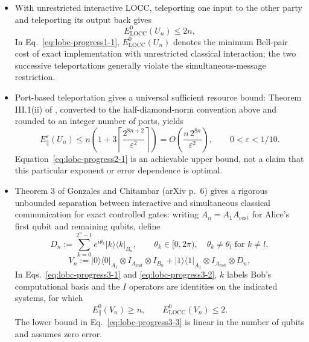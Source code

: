 \begin{itemize}
  \item With unrestricted interactive LOCC, teleporting one input to the other party and teleporting its output back gives
  \begin{equation}
E_{\mathrm{LOCC}}^{0}(U_n)\leq2n,
\label{eq:lobc-progress1-1}
\end{equation}
  In Eq.~\eqref{eq:lobc-progress1-1}, $E_{\mathrm{LOCC}}^{0}(U_n)$ denotes the minimum Bell-pair cost of exact implementation with unrestricted classical interaction; the two successive teleportations generally violate the simultaneous-message restriction. 

  \item Port-based teleportation gives a universal sufficient resource bound: Theorem III.1(ii) of , converted to the half-diamond-norm convention above and rounded to an integer number of ports, yields
  \begin{equation}
E_{\parallel}^{\varepsilon}(U_n)
  \leq n\left(1+3\left\lceil\frac{2^{8n+2}}{\varepsilon^2}\right\rceil\right)
  =O\left(\frac{n\,2^{8n}}{\varepsilon^2}\right),
  \qquad 0<\varepsilon<1/10.
\label{eq:lobc-progress2-1}
\end{equation}
  Equation~\eqref{eq:lobc-progress2-1} is an achievable upper bound, not a claim that this particular exponent or error dependence is optimal. 

  \item Theorem 3 of Gonzales and Chitambar (arXiv p.~6) gives a rigorous unbounded separation between interactive and simultaneous classical communication for exact controlled gates: writing $A_n=A_1A_{\mathrm{rest}}$ for Alice's first qubit and remaining qubits, define
  \begin{equation}
D_n:=\sum_{k=0}^{2^n-1}e^{i\theta_k}|k\rangle\langle k|_{B_n},
  \qquad
  \theta_k\in[0,2\pi),\quad\theta_k\neq\theta_l\text{ for }k\neq l,
\label{eq:lobc-progress3-1}
\end{equation}
  \begin{equation}
V_n:=|0\rangle\langle0|_{A_1}\otimes I_{A_{\mathrm{rest}}}\otimes I_{B_n}
  +|1\rangle\langle1|_{A_1}\otimes I_{A_{\mathrm{rest}}}\otimes D_n,
\label{eq:lobc-progress3-2}
\end{equation}
  In Eqs.~\eqref{eq:lobc-progress3-1} and \eqref{eq:lobc-progress3-2}, $k$ labels Bob's computational basis and the $I$ operators are identities on the indicated systems, for which
  \begin{equation}
E_{\parallel}^{0}(V_n)\geq n,
  \qquad
  E_{\mathrm{LOCC}}^{0}(V_n)\leq2.
\label{eq:lobc-progress3-3}
\end{equation}
  The lower bound in Eq.~\eqref{eq:lobc-progress3-3} is linear in the number of qubits and assumes zero error. 


\end{itemize}
